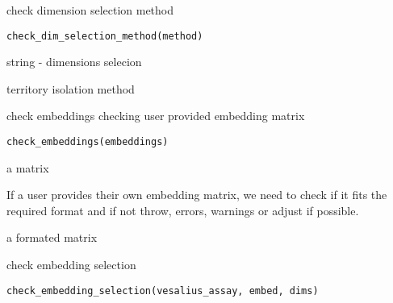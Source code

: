 \documentclass[a4paper]{book}
\begin{document}
%
\begin{Description}
check dimension selection method
\end{Description}
%
\begin{Usage}
\begin{verbatim}
check_dim_selection_method(method)
\end{verbatim}
\end{Usage}
%
\begin{Arguments}
\begin{ldescription}
\item[\code{method}] string - dimensions selecion
\end{ldescription}
\end{Arguments}
%
\begin{Value}
territory isolation method
\end{Value}
%
\begin{Description}
check embeddings
checking user provided embedding matrix
\end{Description}
%
\begin{Usage}
\begin{verbatim}
check_embeddings(embeddings)
\end{verbatim}
\end{Usage}
%
\begin{Arguments}
\begin{ldescription}
\item[\code{embeddings}] a matrix
\end{ldescription}
\end{Arguments}
%
\begin{Details}
If a user provides their own embedding matrix, we need 
to check if it fits the required format and if not throw, errors,
warnings or adjust if possible.
\end{Details}
%
\begin{Value}
a formated matrix
\end{Value}
%
\begin{Description}
check embedding selection
\end{Description}
%
\begin{Usage}
\begin{verbatim}
check_embedding_selection(vesalius_assay, embed, dims)
\end{verbatim}
\end{Usage}
\end{document}
